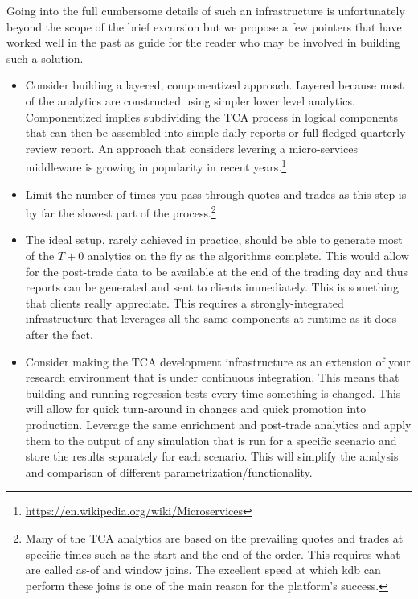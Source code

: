 Going into the full cumbersome details of such an infrastructure is unfortunately beyond the scope of the brief excursion but we propose a few pointers that have worked well in the past as  guide for the reader who may be involved in building such a solution.

\begin{itemize}
\item Consider building a layered, componentized approach. Layered because most of the analytics are constructed using simpler lower level analytics. Componentized implies subdividing the TCA process in logical components that can then be assembled into simple daily reports or full fledged quarterly review report. An approach that considers levering a micro-services middleware is growing in popularity in recent years.\footnote{\url{https://en.wikipedia.org/wiki/Microservices}}

\item Limit the number of times you pass through quotes and trades as this step is by far the slowest part of the process.\footnote{Many of the TCA analytics are based on the prevailing quotes and trades at specific times such as the start and the end of the order. This requires what are called  as-of and window joins. The excellent speed at which kdb can perform these joins is one of the main reason for the platform's success.}

\item The ideal setup, rarely achieved in practice, should be able to generate most of the $T+0$ analytics on the fly as the algorithms complete. This would allow for the post-trade data to be available at the end of the trading day and thus reports can be generated and sent to clients immediately. This is something that clients really appreciate. This requires a strongly-integrated infrastructure that leverages all the same components at runtime as it does after the fact. 

\item Consider making the TCA development infrastructure as an extension of your research environment that is under continuous integration. This means that building and running regression tests every time something is changed. This will allow for quick turn-around in changes and quick promotion into production. Leverage the same enrichment and post-trade analytics and apply them to the output of any simulation that is run for a specific scenario and store the results separately for each scenario. This will simplify the analysis and comparison of different  parametrization/functionality.


\end{itemize}
